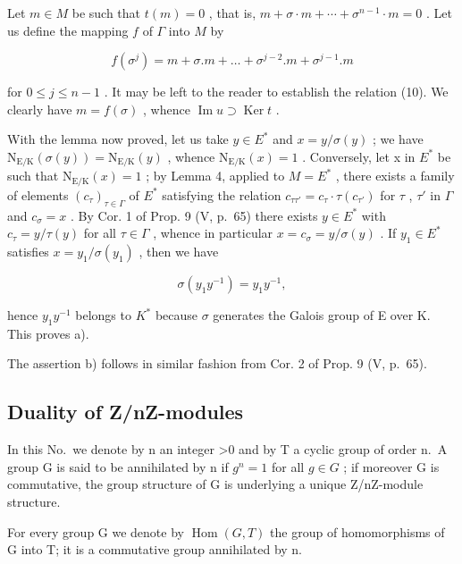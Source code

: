 Let \(m \in M\) be such that \(t(m) = 0\) , that is, \(m + \sigma \cdot m + \cdots + \sigma^{n-1} \cdot m = 0\) . Let us define the mapping \(f\) of \(\Gamma\) into \(M\) by

\[
f \left(\sigma^ {j}\right) = m + \sigma . m + \dots + \sigma^ {j - 2}. m + \sigma^ {j - 1}. m\tag{12}
\]

for \(0 \leqslant j \leqslant n - 1\) . It may be left to the reader to establish the relation (10). We clearly have \(m = f(\sigma)\) , whence \(\operatorname{Im} u \supset \operatorname{Ker} t\) .

With the lemma now proved, let us take \(y \in E^{*}\) and \(x = y / \sigma(y)\) ; we have \(\mathrm{N}_{\mathrm{E}/\mathrm{K}}(\sigma(y)) = \mathrm{N}_{\mathrm{E}/\mathrm{K}}(y)\) , whence \(\mathrm{N}_{\mathrm{E}/\mathrm{K}}(x) = 1\) . Conversely, let x in \(E^{*}\) be such that \(\mathrm{N}_{\mathrm{E}/\mathrm{K}}(x) = 1\) ; by Lemma 4, applied to \(M = E^{*}\) , there exists a family of elements \((c_{\tau})_{\tau \in \Gamma}\) of \(E^{*}\) satisfying the relation \(c_{\tau\tau'} = c_{\tau} \cdot \tau(c_{\tau'})\) for \(\tau\) , \(\tau'\) in \(\Gamma\) and \(c_{\sigma} = x\) . By Cor. 1 of Prop. 9 (V, p.~65) there exists \(y \in E^{*}\) with \(c_{\tau} = y / \tau(y)\) for all \(\tau \in \Gamma\) , whence in particular \(x = c_{\sigma} = y / \sigma(y)\) . If \(y_{1} \in E^{*}\) satisfies \(x = y_{1} / \sigma(y_{1})\) , then we have

\[
\sigma \left(y _ {1} y ^ {- 1}\right) = y _ {1} y ^ {- 1},
\]

hence \(y_{1}y^{-1}\) belongs to \(K^{*}\) because \(\sigma\) generates the Galois group of E over K. This proves a).

The assertion b) follows in similar fashion from Cor. 2 of Prop. 9 (V, p.~65).

\subsection{Duality of Z/nZ-modules}

In this No.~we denote by n an integer \textgreater0 and by T a cyclic group of order n.~A group G is said to be annihilated by n if \(g^{n}=1\) for all \(g\in G\) ; if moreover G is commutative, the group structure of G is underlying a unique Z/nZ-module structure.

For every group G we denote by \(\operatorname{Hom}(G, T)\) the group of homomorphisms of G into T; it is a commutative group annihilated by n.

